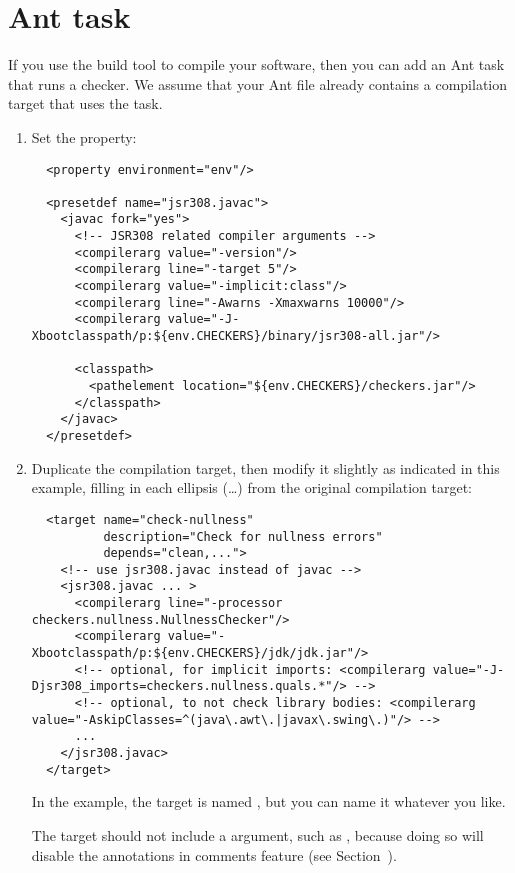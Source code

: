 \section{Ant task\label{ant-task}}

If you use the  build tool to compile
your software, then you can add an Ant task that runs a checker.  We assume
that your Ant file already contains a compilation target that uses the
 task.

\begin{enumerate}
\item
Set the  property:

\begin{smaller}
\begin{Verbatim}
  <property environment="env"/>

  <presetdef name="jsr308.javac">
    <javac fork="yes">
      <!-- JSR308 related compiler arguments -->
      <compilerarg value="-version"/>
      <compilerarg line="-target 5"/>
      <compilerarg value="-implicit:class"/>
      <compilerarg line="-Awarns -Xmaxwarns 10000"/>
      <compilerarg value="-J-Xbootclasspath/p:${env.CHECKERS}/binary/jsr308-all.jar"/>

      <classpath>
        <pathelement location="${env.CHECKERS}/checkers.jar"/>
      </classpath>
    </javac>
  </presetdef>
\end{Verbatim}
\end{smaller}

\item Duplicate the compilation target, then modify it slightly as
indicated in this example, filling in each ellipsis (\ldots) from the
original compilation target:

\begin{smaller}
\begin{Verbatim}
  <target name="check-nullness"
          description="Check for nullness errors"
          depends="clean,...">
    <!-- use jsr308.javac instead of javac -->
    <jsr308.javac ... >
      <compilerarg line="-processor checkers.nullness.NullnessChecker"/>
      <compilerarg value="-Xbootclasspath/p:${env.CHECKERS}/jdk/jdk.jar"/>
      <!-- optional, for implicit imports: <compilerarg value="-J-Djsr308_imports=checkers.nullness.quals.*"/> -->
      <!-- optional, to not check library bodies: <compilerarg value="-AskipClasses=^(java\.awt\.|javax\.swing\.)"/> -->
      ...
    </jsr308.javac>
  </target>
\end{Verbatim}
\end{smaller}

In the example, the target is named , but you can
name it whatever you like.

The target should not include a  argument, such as
, because doing so will disable the annotations in
comments feature (see Section~).
\end{enumerate}

